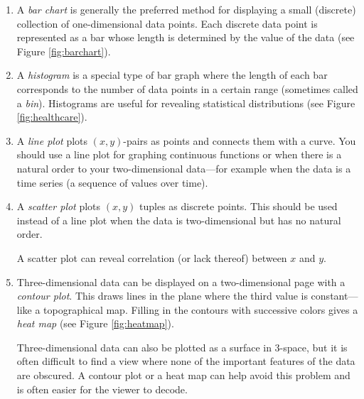 \begin{enumerate}


\item A \emph{bar chart} is generally the preferred method for displaying a small (discrete) collection of one-dimensional data points. Each discrete data point is represented as a bar whose length is determined by the value of the data (see Figure \ref{fig:barchart}).

\item A \emph{histogram} is a special type of  bar graph where the length of each bar corresponds to the number of data points in a certain range (sometimes called a \emph{bin}).  Histograms are useful for revealing statistical distributions (see Figure \ref{fig:healthcare}).

\item A \emph{line plot} plots $(x,y)$-pairs as points and connects them with a curve. 
You should use a line plot for graphing continuous functions or when there is a natural order to your two-dimensional data---for example when the data is a time series (a sequence of values over time). 

\item A \emph{scatter plot} plots $(x,y)$ tuples as discrete points.  This should be used instead of a line plot when the data is two-dimensional but has no natural order. 
 
A scatter plot can reveal correlation (or lack thereof) between $x$ and $y$. 


\item Three-dimensional data can be displayed on a two-dimensional page with a \emph{contour plot}.  This draws lines in the plane where the third value is constant---like a topographical map.  Filling in the contours with successive colors gives a  \emph{heat map} (see Figure \ref{fig:heatmap}).

Three-dimensional data can also be plotted as a surface in 3-space, but it is often difficult to find a view where none of the important features of the data are obscured.
A contour plot or a heat map can help avoid this problem and is often easier for the viewer to decode.



\end{enumerate}
